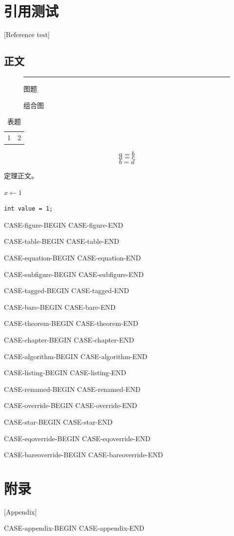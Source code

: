 
\ifdefined\HitBook\mainmatter\chapter{引用测试}[Reference test]\label{chapter}\fi
\section{正文}
\begin{figure}[htbp]\centering\rule{20mm}{3mm}\caption{图题}\label{figure}\end{figure}
\begin{figure}[htbp]\centering
  \subfigure[子图]{\rule{20mm}{3mm}\label{panel}}\caption{组合图}
\end{figure}
\begin{table}[htbp]\caption{表题}\label{table}\begin{tabular}{cc}1&2\end{tabular}\end{table}
\begin{equation}a=b\label{equation}\end{equation}
\begin{equation}a=c\tag{S}\label{tagged}\end{equation}
\begin{equation}b=d\tag*{T}\label{bare}\end{equation}
\begin{theorem}\label{theorem}定理正文。\end{theorem}
\ifdefined\HitStyle
  \begin{algorithm}[htbp]\caption{算法}\label{algorithm}$x\gets 1$\;\end{algorithm}
  \begin{lstlisting}[caption={Code},label={listing}]
int value = 1;
  \end{lstlisting}
\fi
\clearpage
\newcommand\HitReferenceCase[2]{\par\noindent CASE-#1-BEGIN #2 CASE-#1-END\par}
\HitReferenceCase{figure}{}
\HitReferenceCase{table}{}
\HitReferenceCase{equation}{}
\HitReferenceCase{subfigure}{}
\HitReferenceCase{tagged}{}
\HitReferenceCase{bare}{}
\HitReferenceCase{theorem}{}
\ifdefined\HitBook\HitReferenceCase{chapter}{}\fi
\ifdefined\HitStyle
  \HitReferenceCase{algorithm}{}
  \HitReferenceCase{listing}{}
\fi
\ifdefined\HitEnglish
  \renewcommand\figurename{Illustration}
\else
  \renewcommand\figurename{示意图}
\fi
\HitReferenceCase{renamed}{}
\HitReferenceCase{override}{}
\HitReferenceCase{star}{}
\HitReferenceCase{eqoverride}{}
\HitReferenceCase{bareoverride}{}
\ifdefined\HitBook
  \appendix\chapter{附录}[Appendix]\label{appendix}
  \HitReferenceCase{appendix}{}
\fi

